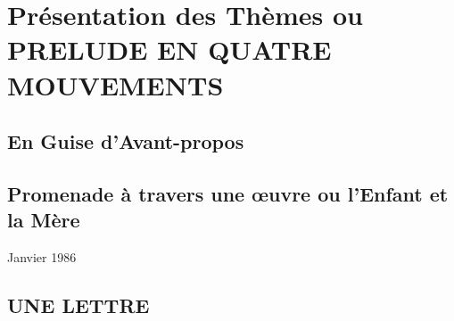 \part{Présentation des Thèmes ou PRELUDE EN QUATRE MOUVEMENTS}

\chapter{En Guise d'Avant-propos}

\chapter{Promenade à travers une œuvre ou l’Enfant et la Mère}
Janvier 1986





















\chapter{UNE LETTRE}




